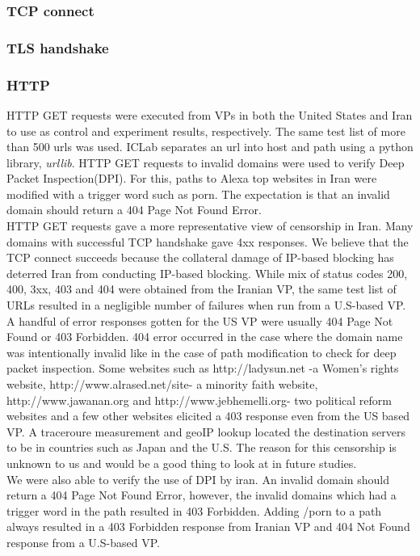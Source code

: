 \subsubsection{TCP connect} 
\subsubsection{TLS handshake}
\subsubsection{HTTP}
 HTTP GET requests were executed from VPs  in both the United States and Iran to use as control and experiment results, respectively. The same test list of more than 500 urls was used. ICLab separates an url into host and path using a python library, \textit{urllib}. HTTP GET requests to invalid domains were used to verify Deep Packet Inspection(DPI). For this, paths to Alexa top websites in Iran were modified with a trigger word such as porn. The expectation is that an invalid domain should return a 404 Page Not Found Error.\\
HTTP GET requests gave a more representative view of censorship in Iran. Many domains with successful TCP handshake gave 4xx responses. We believe that  the TCP connect succeeds because the collateral damage of IP-based blocking has deterred Iran from conducting IP-based blocking. While mix of status codes 200, 400, 3xx, 403 and 404 were obtained from the Iranian VP, the same test list of URLs resulted in a negligible number of failures when run from a U.S-based VP.  A handful of error responses gotten for the US VP were usually  404 Page Not Found or 403 Forbidden. 404 error occurred in the case where the domain name was intentionally invalid like in the case of path modification to check for deep packet inspection. Some websites such as http://ladysun.net -a Women's rights website, http://www.alrased.net/site- a minority faith website, http://www.jawanan.org and http://www.jebhemelli.org- two political reform websites and a few other websites elicited a 403 response even from the US based VP. A traceroure measurement and geoIP lookup located the destination servers to be in countries such as  Japan and the U.S.  The reason for this censorship is unknown to us and would be a good thing to look at in future studies.\\
We were also able to verify the use of DPI by iran. An invalid domain should return a 404 Page Not Found Error, however, the invalid domains which had a trigger word in the path resulted in 403 Forbidden. Adding /porn to a path always resulted in a 403 Forbidden response from Iranian VP and 404 Not Found response from a U.S-based VP. \\ 



